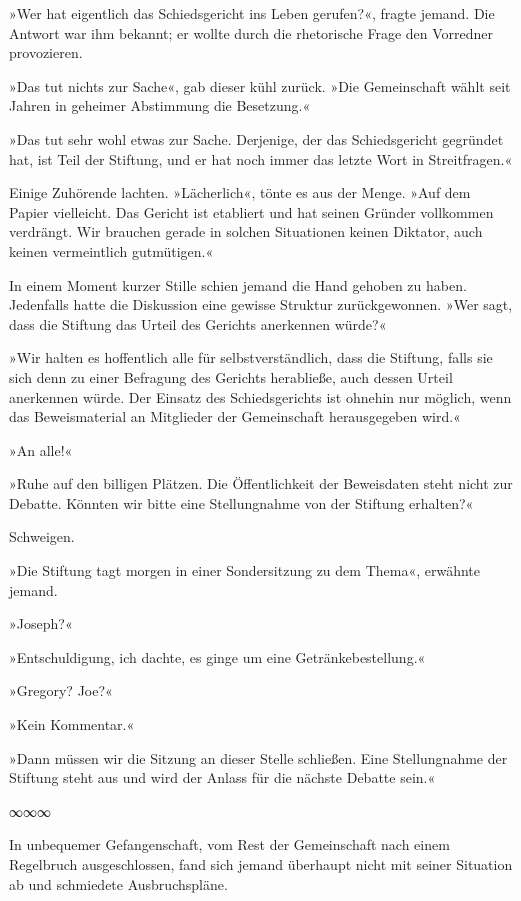 »Wer hat eigentlich das Schiedsgericht ins Leben gerufen?«, fragte jemand. Die Antwort war ihm bekannt; er wollte durch die rhetorische Frage den Vorredner provozieren.

»Das tut nichts zur Sache«, gab dieser kühl zurück. »Die Gemeinschaft wählt seit Jahren in geheimer Abstimmung die Besetzung.«

»Das tut sehr wohl etwas zur Sache. Derjenige, der das Schiedsgericht gegründet hat, ist Teil der Stiftung, und er hat noch immer das letzte Wort in Streitfragen.«

Einige Zuhörende lachten. »Lächerlich«, tönte es aus der Menge. »Auf dem Papier vielleicht. Das Gericht ist etabliert und hat seinen Gründer vollkommen verdrängt. Wir brauchen gerade in solchen Situationen keinen Diktator, auch keinen vermeintlich gutmütigen.«

In einem Moment kurzer Stille schien jemand die Hand gehoben zu haben. Jedenfalls hatte die Diskussion eine gewisse Struktur zurückgewonnen. »Wer sagt, dass die Stiftung das Urteil des Gerichts anerkennen würde?«

»Wir halten es hoffentlich alle für selbstverständlich, dass die Stiftung, falls sie sich denn zu einer Befragung des Gerichts herabließe, auch dessen Urteil anerkennen würde. Der Einsatz des Schiedsgerichts ist ohnehin nur möglich, wenn das Beweismaterial an Mitglieder der Gemeinschaft herausgegeben wird.«

»An alle!«

»Ruhe auf den billigen Plätzen. Die Öffentlichkeit der Beweisdaten steht nicht zur Debatte. Könnten wir bitte eine Stellungnahme von der Stiftung erhalten?«

Schweigen.

»Die Stiftung tagt morgen in einer Sondersitzung zu dem Thema«, erwähnte jemand.

»Joseph?«

»Entschuldigung, ich dachte, es ginge um eine Getränkebestellung.«

»Gregory? Joe?«

»Kein Kommentar.«

»Dann müssen wir die Sitzung an dieser Stelle schließen. Eine Stellungnahme der Stiftung steht aus und wird der Anlass für die nächste Debatte sein.«

\begin{center}
∞∞∞
\end{center}

In unbequemer Gefangenschaft, vom Rest der Gemeinschaft nach einem Regelbruch ausgeschlossen, fand sich jemand überhaupt nicht mit seiner Situation ab und schmiedete Ausbruchspläne.

